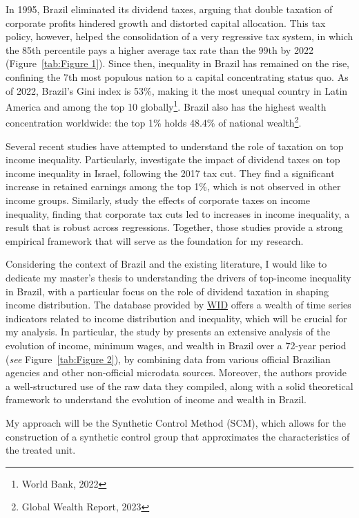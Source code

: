 \documentclass[a4paper, 12pt]{article}
\begin{document}
In 1995, Brazil eliminated its dividend taxes, arguing that double taxation of corporate profits hindered growth and distorted capital allocation.
This tax policy, however, helped the consolidation of a very regressive tax system, in which the 85th percentile pays a higher average tax rate than the 99th by 2022 (Figure~\ref{tab:Figure 1}). 
Since then, inequality in Brazil has remained on the rise, confining the 7th most populous nation to a capital concentrating status quo. 
As of 2022, Brazil's Gini index is 53\%, making it the most unequal country in Latin America and among the top 10 globally\footnote{World Bank, 2022}.
Brazil also has the highest wealth concentration worldwide: the top 1\% holds 48.4\% of national wealth\footnote{Global Wealth Report, 2023}.
\par
Several recent studies have attempted to understand the role of taxation on top income inequality. 
Particularly, \cite{berman2024capital} investigate the impact of dividend taxes on top income inequality in Israel, following the 2017 tax cut. 
They find a significant increase in retained earnings among the top 1\%, which is not observed in other income groups.
Similarly, \cite{nallareddy2021corporate} study the effects of corporate taxes on income inequality, finding that corporate tax cuts led to increases in income inequality, a result that is robust across regressions.
Together, those studies provide a strong empirical framework that will serve as the foundation for my research.
\par
Considering the context of Brazil and the existing literature, I would like to dedicate my master’s thesis to understanding the drivers of top-income inequality in Brazil, with a particular focus on the role of dividend taxation in shaping income distribution.
The database provided by \href{https://wid.world/country/brazil/}{WID} offers a wealth of time series indicators related to income distribution and inequality, which will be crucial for my analysis.
In particular, the study by \cite{morgan2025distribution} presents an extensive analysis of the evolution of income, minimum wages, and wealth in Brazil over a 72-year period (\textit{see} Figure~\ref{tab:Figure 2}), by combining data from various official Brazilian agencies and other non-official microdata sources.
Moreover, the authors provide a well-structured use of the raw data they compiled, along with a solid theoretical framework to understand the evolution of income and wealth in Brazil.
\par    
My approach will be the Synthetic Control Method (SCM), which allows for the construction of a synthetic control group that approximates the characteristics of the treated unit.
\end{document}
